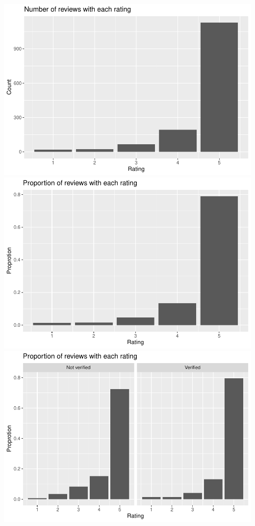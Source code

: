 \documentclass[
  11pt,
]{article}
\begin{document}
\includegraphics{Assignment-STAT702_files/figure-latex/3a plots-1.pdf}
\includegraphics{Assignment-STAT702_files/figure-latex/3a plots-2.pdf}
\includegraphics{Assignment-STAT702_files/figure-latex/3a plots-3.pdf}
\end{document}
